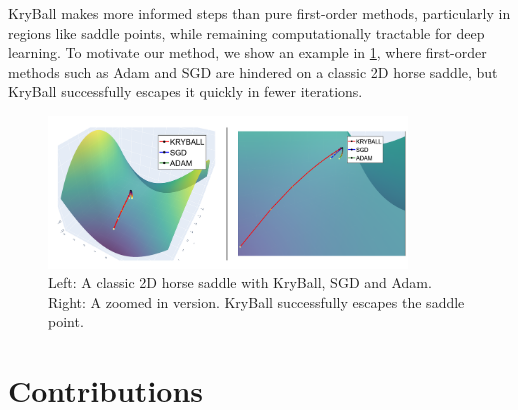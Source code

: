 KryBall makes more informed steps than pure first-order methods, particularly in regions like saddle points, while remaining computationally tractable for deep learning. To motivate our method, we show an example in \cref{fig:toy_example}, where first-order methods such as Adam and SGD are hindered on a classic 2D horse saddle, but KryBall successfully escapes it quickly in fewer iterations.

\begin{figure}[h]
  \centering
    \includegraphics[width=0.85\textwidth]{figures/0intro/intro_toy.png}
    \caption{Left: A classic 2D horse saddle with KryBall, SGD and Adam. Right: A zoomed in version. KryBall successfully escapes the saddle point.}
    \label{fig:toy_example}
\end{figure}

\section{Contributions}
\label{sec:contributions}

